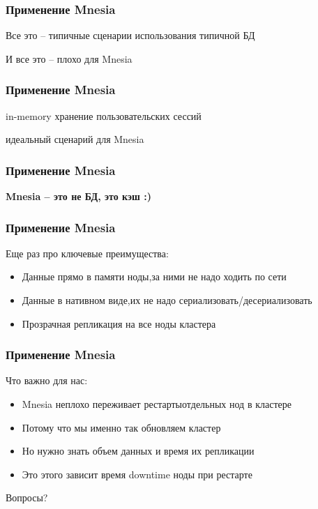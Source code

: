 \documentclass[10pt]{beamer}
\begin{document}
\begin{frame}
\frametitle{Применение Mnesia}
\centering
Все это -- типичные сценарии использования типичной БД
\par \bigskip
И все это -- плохо для Mnesia
\end{frame}

\begin{frame}
\frametitle{Применение Mnesia}
\centering
in-memory хранение пользовательских сессий
\par \bigskip
идеальный сценарий для Mnesia
\end{frame}

\begin{frame}
\frametitle{Применение Mnesia}
\centering
\textbf{Mnesia -- это не БД, это кэш :)}
\end{frame}

\begin{frame}
\frametitle{Применение Mnesia}
Еще раз про ключевые преимущества:
\begin{itemize}
\item Данные прямо в памяти ноды,\newline за ними не надо ходить по сети
\item Данные в нативном виде,\newline их не надо сериализовать/десериализовать
\item Прозрачная репликация на все ноды кластера
\end{itemize}
\end{frame}

\begin{frame}
\frametitle{Применение Mnesia}
Что важно для нас:
\begin{itemize}
\item Mnesia неплохо переживает рестарты\newline отдельных нод в кластере
\item Потому что мы именно так обновляем кластер
\item Но нужно знать объем данных и время их репликации
\item Это этого зависит время downtime ноды при рестарте
\end{itemize}
\end{frame}

\begin{frame}
\centering
Вопросы?
\end{frame}
\end{document}
